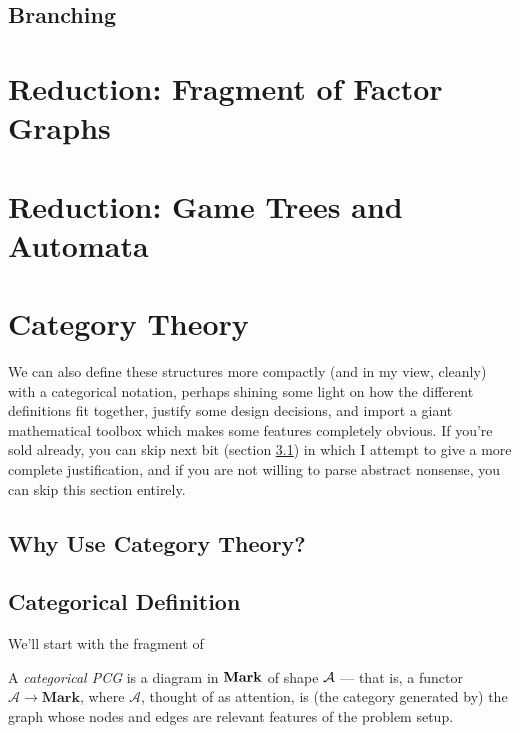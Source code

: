\documentclass{article}
\begin{document}
	\subsection{Branching}
	


	\section{Reduction: Fragment of Factor Graphs}
	\section{Reduction: Game Trees and Automata}


	\section{Category Theory}

	We can also define these structures more compactly (and in my view, cleanly) with a categorical notation, perhaps shining some light on how the different definitions fit together, justify some design decisions, and import a giant mathematical toolbox which makes some features completely obvious. If you're sold already, you can skip next bit (section \ref{sec:cat-defense}) in which I attempt to give a more complete justification, and if you are not willing to parse abstract nonsense, you can skip this section entirely.
	
	\subsection{Why Use Category Theory?}\label{sec:cat-defense}
	

	\subsection{Categorical Definition}\label{sec:cat-defs}
	We'll start with the fragment of 
	
	\begin{defn}
		A \emph{categorical PCG} is a diagram in $\bf Mark$ of shape $\cal A$ --- that is, a functor $\mathcal A \to \mathbf{Mark}$, where $\mathcal A$, thought of as attention, is (the category generated by) the graph whose nodes and edges are relevant features of the problem setup.
	\end{defn}
	
\end{document}
